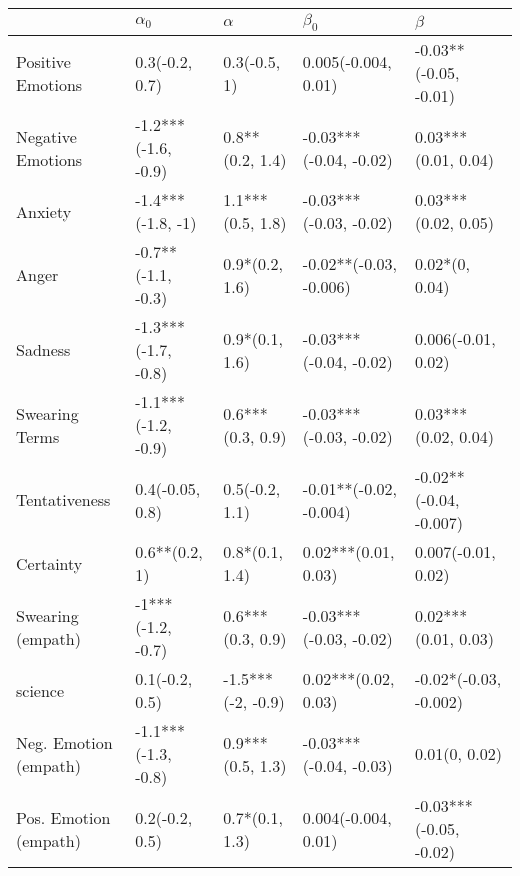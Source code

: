 \begin{tabular}{lllll}
\toprule
{} &           $\alpha_0$ &           $\alpha$ &               $\beta_0$ &                 $\beta$ \\
\midrule
Positive Emotions     &       0.3(-0.2, 0.7) &       0.3(-0.5, 1) &     0.005(-0.004, 0.01) &   -0.03**(-0.05, -0.01) \\
Negative Emotions     &  -1.2***(-1.6, -0.9) &    0.8**(0.2, 1.4) &  -0.03***(-0.04, -0.02) &     0.03***(0.01, 0.04) \\
Anxiety               &    -1.4***(-1.8, -1) &   1.1***(0.5, 1.8) &  -0.03***(-0.03, -0.02) &     0.03***(0.02, 0.05) \\
Anger                 &   -0.7**(-1.1, -0.3) &     0.9*(0.2, 1.6) &  -0.02**(-0.03, -0.006) &          0.02*(0, 0.04) \\
Sadness               &  -1.3***(-1.7, -0.8) &     0.9*(0.1, 1.6) &  -0.03***(-0.04, -0.02) &      0.006(-0.01, 0.02) \\
Swearing Terms        &  -1.1***(-1.2, -0.9) &   0.6***(0.3, 0.9) &  -0.03***(-0.03, -0.02) &     0.03***(0.02, 0.04) \\
Tentativeness         &      0.4(-0.05, 0.8) &     0.5(-0.2, 1.1) &  -0.01**(-0.02, -0.004) &  -0.02**(-0.04, -0.007) \\
Certainty             &        0.6**(0.2, 1) &     0.8*(0.1, 1.4) &     0.02***(0.01, 0.03) &      0.007(-0.01, 0.02) \\
Swearing (empath)     &    -1***(-1.2, -0.7) &   0.6***(0.3, 0.9) &  -0.03***(-0.03, -0.02) &     0.02***(0.01, 0.03) \\
science               &       0.1(-0.2, 0.5) &  -1.5***(-2, -0.9) &     0.02***(0.02, 0.03) &   -0.02*(-0.03, -0.002) \\
Neg. Emotion (empath) &  -1.1***(-1.3, -0.8) &   0.9***(0.5, 1.3) &  -0.03***(-0.04, -0.03) &           0.01(0, 0.02) \\
Pos. Emotion (empath) &       0.2(-0.2, 0.5) &     0.7*(0.1, 1.3) &     0.004(-0.004, 0.01) &  -0.03***(-0.05, -0.02) \\
\bottomrule
\end{tabular}
